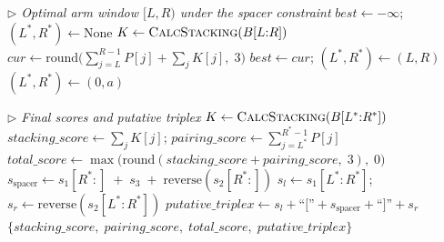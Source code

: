 \begin{algorithm}
\begin{algorithmic}[1]
\Statex \textit{$\triangleright$ Optimal arm window $[L, R)$ under the spacer constraint}
\State $\mathit{best} \leftarrow -\infty$;\; $(L^*, R^*) \leftarrow \mathrm{None}$
            \State $K \leftarrow \textsc{CalcStacking}(B[L{:}R])$
            \State $\mathit{cur} \leftarrow
                   \mathrm{round}\!\bigl(\textstyle\sum_{j=L}^{R-1} P[j]
                   + \sum_j K[j],\; 3\bigr)$
                \State $\mathit{best} \leftarrow \mathit{cur}$;\;
                       $(L^*, R^*) \leftarrow (L, R)$
            \EndIf
        \EndIf
    \EndFor
\EndFor
{}
    \State $(L^*, R^*) \leftarrow (0, a)$
\EndIf

\Statex \textit{$\triangleright$ Final scores and putative triplex}
\State $K \leftarrow \textsc{CalcStacking}(B[L^*{:}R^*])$
\State $\mathit{stacking\_score} \leftarrow \textstyle\sum_j K[j]$;\;
       $\mathit{pairing\_score} \leftarrow \textstyle\sum_{j=L^*}^{R^*-1} P[j]$
\State $\mathit{total\_score} \leftarrow
       \max\bigl(\mathrm{round}(\mathit{stacking\_score} + \mathit{pairing\_score},\; 3),\; 0\bigr)$
\State $s_{\mathrm{spacer}} \leftarrow
       s_1[R^*{:}] \;+\; s_3 \;+\; \mathrm{reverse}(s_2[R^*{:}])$
\State $s_l \leftarrow s_1[L^*{:}R^*]$;\;
       $s_r \leftarrow \mathrm{reverse}(s_2[L^*{:}R^*])$
\State $\mathit{putative\_triplex} \leftarrow
       s_l + \text{``[''} + s_{\mathrm{spacer}} + \text{``]''} + s_r$
\State \Return $\{\mathit{stacking\_score},\;
                  \mathit{pairing\_score},\;
                  \mathit{total\_score},\;
                  \mathit{putative\_triplex}\}$
\end{algorithmic}
\end{algorithm}
